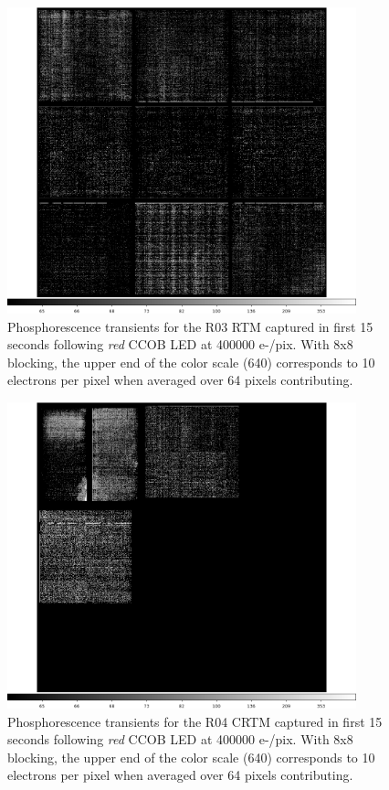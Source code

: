 \begin{figure}[!htbp]
\centering
\includegraphics[width=0.9\textwidth]{sections/figures/phosphorescence-survey/itl_fluor_R03_0-19_rb1_log.png}
\caption{Phosphorescence transients for the R03 RTM captured in first 15 seconds following {\it red} CCOB LED at 400000 e-/pix. With 8x8 blocking, the upper end of the color scale (640) corresponds to 10 electrons per pixel when averaged over 64 pixels contributing.}
\label{fig:phos:R03}
\end{figure}

\begin{figure}[!htbp]
\centering
\includegraphics[width=0.9\textwidth]{sections/figures/phosphorescence-survey/itl_fluor_R04_0-19_rb1_log.png}
\caption{Phosphorescence transients for the R04 CRTM captured in first 15 seconds following {\it red} CCOB LED at 400000 e-/pix. With 8x8 blocking, the upper end of the color scale (640) corresponds to 10 electrons per pixel when averaged over 64 pixels contributing.}
\label{fig:phos:R04}
\end{figure}

